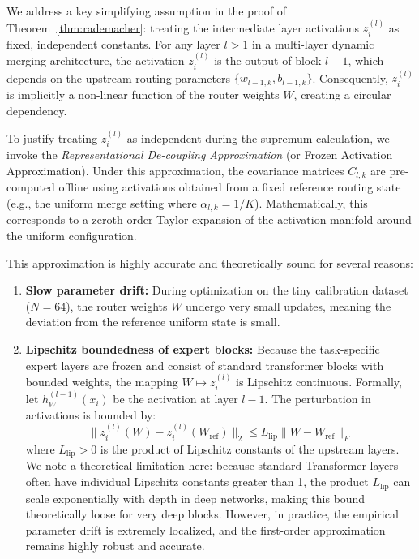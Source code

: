 \begin{remark}
We address a key simplifying assumption in the proof of Theorem~\ref{thm:rademacher}: treating the intermediate layer activations $z_i^{(l)}$ as fixed, independent constants. For any layer $l > 1$ in a multi-layer dynamic merging architecture, the activation $z_i^{(l)}$ is the output of block $l-1$, which depends on the upstream routing parameters $\{w_{l-1, k}, b_{l-1, k}\}$. Consequently, $z_i^{(l)}$ is implicitly a non-linear function of the router weights $W$, creating a circular dependency.

To justify treating $z_i^{(l)}$ as independent during the supremum calculation, we invoke the \emph{Representational De-coupling Approximation} (or Frozen Activation Approximation). Under this approximation, the covariance matrices $C_{l, k}$ are pre-computed offline using activations obtained from a fixed reference routing state (e.g., the uniform merge setting where $\alpha_{l, k} = 1/K$). Mathematically, this corresponds to a zeroth-order Taylor expansion of the activation manifold around the uniform configuration. 

This approximation is highly accurate and theoretically sound for several reasons:
\begin{enumerate}
    \item \textbf{Slow parameter drift:} During optimization on the tiny calibration dataset ($N=64$), the router weights $W$ undergo very small updates, meaning the deviation from the reference uniform state is small.
    \item \textbf{Lipschitz boundedness of expert blocks:} Because the task-specific expert layers are frozen and consist of standard transformer blocks with bounded weights, the mapping $W \mapsto z_i^{(l)}$ is Lipschitz continuous. Formally, let $h_W^{(l-1)}(x_i)$ be the activation at layer $l-1$. The perturbation in activations is bounded by:
    \begin{equation}
        \|z_i^{(l)}(W) - z_i^{(l)}(W_{\text{ref}})\|_2 \leq L_{\text{lip}} \|W - W_{\text{ref}}\|_F
    \end{equation}
    where $L_{\text{lip}} > 0$ is the product of Lipschitz constants of the upstream layers. We note a theoretical limitation here: because standard Transformer layers often have individual Lipschitz constants greater than 1, the product $L_{\text{lip}}$ can scale exponentially with depth in deep networks, making this bound theoretically loose for very deep blocks. However, in practice, the empirical parameter drift is extremely localized, and the first-order approximation remains highly robust and accurate.
    

\end{enumerate}
\end{remark}
